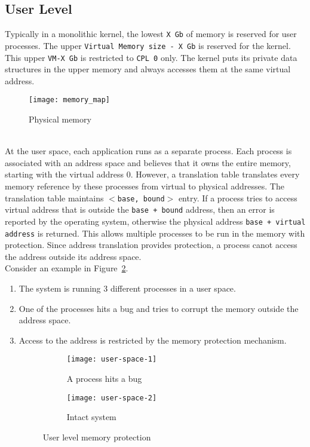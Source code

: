 \subsection{User Level}
\label{subsec:user level}
Typically in a monolithic kernel, the lowest \texttt{X Gb} of memory is reserved for user processes. The upper \texttt{Virtual Memory size - X Gb} is reserved for the kernel. This upper \texttt{VM-X Gb} is restricted to \texttt{CPL 0} only. The kernel puts its private data structures in the upper memory and always accesses them at the same virtual address. 
\begin{figure}[!ht]
\centering
\texttt{[image: memory\_map]}
\caption{Physical memory}
\label{fig:memmap}
\end{figure}
\\[3mm]
At the user space, each application runs as a separate process. Each process is associated with an address space and believes that it owns the entire memory, starting with the virtual address 0. However, a translation table translates every memory reference by these processes from virtual to physical addresses. The translation table maintains \texttt{$<$base, bound$>$} entry. If a process tries to access virtual address that is outside the \texttt{base + bound} address, then an error is reported by the operating system, otherwise the physical address \texttt{base + virtual address} is returned. This allows multiple processes to be run in the memory with protection. Since address translation provides protection, a process canot access the address outside its address space.
\\[3mm]
Consider an example in Figure~\ref{fig:User space}.
\begin{enumerate}
\item The system is running 3 different processes in a user space.
\item One of the processes hits a bug and tries to corrupt the memory outside the address space.
\item Access to the address is restricted by the memory protection mechanism.
\begin{figure}[!ht]
    \centering
    \begin{subfigure}[b]{0.49\textwidth}
	\texttt{[image: user-space-1]}
	\caption{A process hits a bug}
    \end{subfigure}
	\hfill
    \begin{subfigure}[b]{0.49\textwidth}
	\texttt{[image: user-space-2]}
	\caption{Intact system}
    \end{subfigure}
    \caption{User level memory protection}\label{fig:User space}
\end{figure}
\end{enumerate}

